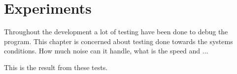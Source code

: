 \chapter{Experiments}\label{chap:experiments}
Throughout the development a lot of testing have been done to debug the program. This chapter is concerned about testing done towards the systems conditions. How much noise can it handle, what is the speed and ... 

This is the result from these tests.